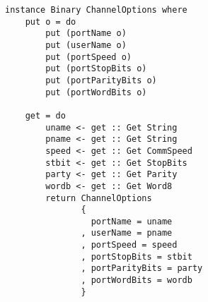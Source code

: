 \documentclass[russian,utf8,simple,emptystyle]{eskdtext}
\begin{document}
\begin{lstlisting}
instance Binary ChannelOptions where
    put o = do 
        put (portName o)
        put (userName o)
        put (portSpeed o)
        put (portStopBits o)
        put (portParityBits o)
        put (portWordBits o)

    get = do 
        uname <- get :: Get String 
        pname <- get :: Get String
        speed <- get :: Get CommSpeed 
        stbit <- get :: Get StopBits
        party <- get :: Get Parity 
        wordb <- get :: Get Word8 
        return ChannelOptions 
               {
                 portName = uname 
               , userName = pname 
               , portSpeed = speed 
               , portStopBits = stbit 
               , portParityBits = party
               , portWordBits = wordb 
               }
\end{lstlisting}
\end{document}
